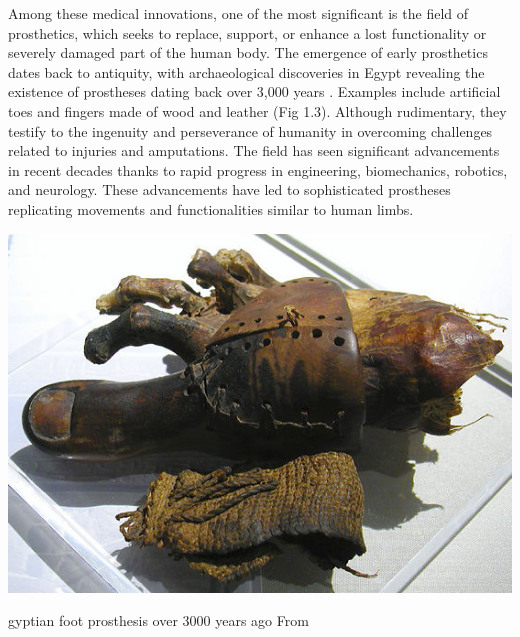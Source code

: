 Among these medical innovations, one of the most significant is the field of prosthetics, which seeks to replace, support, or enhance a lost functionality or severely damaged part of the human body. The emergence of early prosthetics dates back to antiquity, with archaeological discoveries in Egypt revealing the existence of prostheses dating back over 3,000 years \cite{noauthor_prosthesis_2023}. Examples include artificial toes and fingers made of wood and leather (Fig 1.3). Although rudimentary, they testify to the ingenuity and perseverance of humanity in overcoming challenges related to injuries and amputations. The field has seen significant advancements in recent decades thanks to rapid progress in engineering, biomechanics, robotics, and neurology. These advancements have led to sophisticated prostheses replicating movements and functionalities similar to human limbs.

\begin{marginfigure}[-5.5cm]
	\includegraphics{YOURNAME/images/fig 1.3.jpg}
	\caption[]Egyptian foot prosthesis over 3000 years ago From \cite{noauthor_prosthesis_2023} 
	\labfig{}
\end{marginfigure} 


